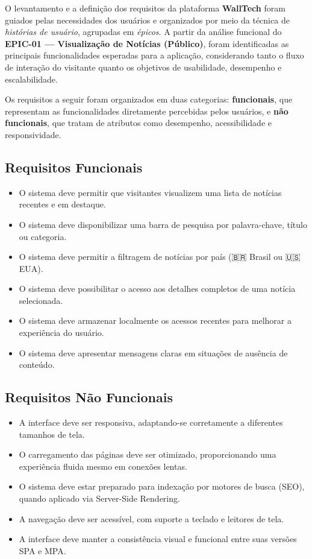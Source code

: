 O levantamento e a definição dos requisitos da plataforma \textbf{WallTech} foram guiados pelas necessidades dos usuários e organizados por meio da técnica de \textit{histórias de usuário}, agrupadas em \textit{épicos}. A partir da análise funcional do \textbf{EPIC-01 — Visualização de Notícias (Público)}, foram identificadas as principais funcionalidades esperadas para a aplicação, considerando tanto o fluxo de interação do visitante quanto os objetivos de usabilidade, desempenho e escalabilidade.

Os requisitos a seguir foram organizados em duas categorias: \textbf{funcionais}, que representam as funcionalidades diretamente percebidas pelos usuários, e \textbf{não funcionais}, que tratam de atributos como desempenho, acessibilidade e responsividade.

\subsection{Requisitos Funcionais}
\label{subsec:requisitos-funcionais}

\begin{itemize}
  \item O sistema deve permitir que visitantes visualizem uma lista de notícias recentes e em destaque.
  \item O sistema deve disponibilizar uma barra de pesquisa por palavra-chave, título ou categoria.
  \item O sistema deve permitir a filtragem de notícias por país (🇧🇷 Brasil ou 🇺🇸 EUA).
  \item O sistema deve possibilitar o acesso aos detalhes completos de uma notícia selecionada.
  \item O sistema deve armazenar localmente os acessos recentes para melhorar a experiência do usuário.
  \item O sistema deve apresentar mensagens claras em situações de ausência de conteúdo.
\end{itemize}

\subsection{Requisitos Não Funcionais}
\label{subsec:requisitos-nao-funcionais}

\begin{itemize}
  \item A interface deve ser responsiva, adaptando-se corretamente a diferentes tamanhos de tela.
  \item O carregamento das páginas deve ser otimizado, proporcionando uma experiência fluida mesmo em conexões lentas.
  \item O sistema deve estar preparado para indexação por motores de busca (SEO), quando aplicado via Server-Side Rendering.
  \item A navegação deve ser acessível, com suporte a teclado e leitores de tela.
  \item A interface deve manter a consistência visual e funcional entre suas versões SPA e MPA.
\end{itemize}




